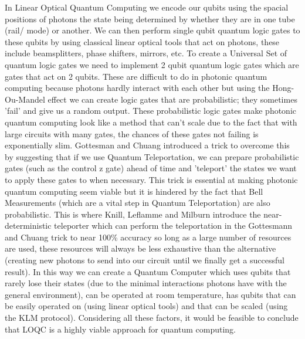 In Linear Optical Quantum Computing we encode our qubits using the spacial positions of photons the state being determined by whether they are in one tube (rail/ mode) or another. We can then perform single qubit quantum logic gates to these qubits by using classical linear optical tools that act on photons, these include beamsplitters, phase shifters, mirrors, etc. To create a Universal Set of quantum logic gates we need to implement 2 qubit quantum logic gates which are gates that act on 2 qubits. These are difficult to do in photonic quantum computing because photons hardly interact with each other but using the Hong-Ou-Mandel effect we can create logic gates that are probabilistic; they sometimes 'fail' and give us a random output. These probabilistic logic gates make photonic quantum computing look like a method that can't scale due to the fact that with large circuits with many gates, the chances of these gates not failing is exponentially slim. Gottesman and Chuang introduced a trick to overcome this by suggesting that if we use Quantum Teleportation, we can prepare probabilistic gates (such as the control z gate) ahead of time and 'teleport' the states we want to apply these gates to when necessary. This trick is essential at making photonic quantum computing seem viable but it is hindered by the fact that Bell Measurements (which are a vital step in Quantum Teleportation) are also probabilistic. This is where Knill, Leflamme and Milburn introduce the near-deterministic teleporter which can perform the teleportation in the Gottesmann and Chuang trick to near 100\% accuracy so long as a large number of resources are used, these resources will always be less exhaustive  than the alternative (creating new photons to send into our circuit until we finally get a successful result). In this way we can create a Quantum Computer which uses qubits that rarely lose their states (due to the minimal interactions photons have with the general environment), can be operated at room temperature, has qubits that can be easily operated on (using linear optical tools) and that can be scaled (using the KLM protocol). Considering all these factors, it would be feasible to conclude that LOQC is a highly viable approach for quantum computing.